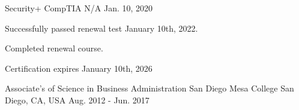

\begin{cventries}

	\cventry
	{Security+}
	{CompTIA}
	{N/A}
	{Jan. 10, 2020}
	{
		\begin{cvitems} %
			\item {Successfully passed renewal test January 10th, 2022.}
			\item {Completed renewal course.}
			\item {Certification expires January 10th, 2026}
		\end{cvitems}
	}

	\cventry
	{Associate's of Science in Business Administration}
	{San Diego Mesa College}
	{San Diego, CA, USA}
	{Aug. 2012 - Jun. 2017}
	{}

\end{cventries}
